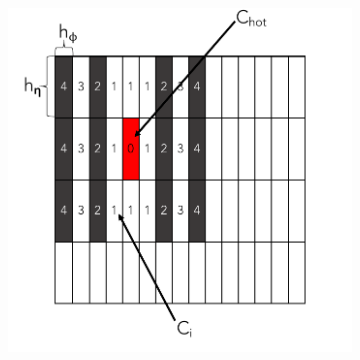 \begin{figure}[!ht]
  \begin{center}
  \begin{subfigure}[c]{.48\textwidth}
  \centering
  \includegraphics[width=\textwidth]{sections/03_ringer/figures/reco_steps/ring_em1_mask.pdf}
  \caption{}
  \label{fig:building_rings_a}
  \end{subfigure}\\
  \centering
  

\end{center}
\end{figure}
